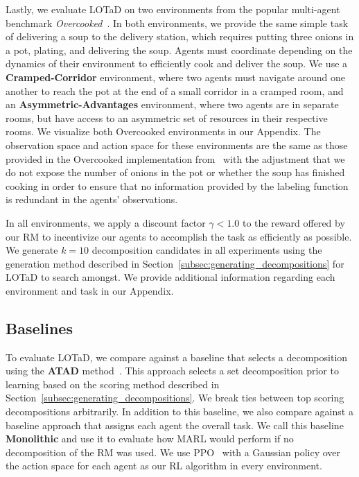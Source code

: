 Lastly, we evaluate LOTaD on two environments from the popular multi-agent benchmark \textit{Overcooked}~\cite{carroll2019overcooked}. In both environments, we provide the same simple task of delivering a soup to the delivery station, which requires putting three onions in a pot, plating, and delivering the soup. Agents must coordinate depending on the dynamics of their environment to efficiently cook and deliver the soup. We use a \textbf{Cramped-Corridor} environment, where two agents must navigate around one another to reach the pot at the end of a small corridor in a cramped room, and an \textbf{Asymmetric-Advantages} environment, where two agents are in separate rooms, but have access to an asymmetric set of resources in their respective rooms. We visualize both Overcooked environments in our Appendix. The observation space and action space for these environments are the same as those provided in the Overcooked implementation from~\cite{flair2023jaxmarl} with the adjustment that we do not expose the number of onions in the pot or whether the soup has finished cooking in order to ensure that no information provided by the labeling function is redundant in the agents' observations.


 In all environments, we apply a discount factor $\gamma < 1.0$ to the reward offered by our RM to incentivize our agents to accomplish the task as efficiently as possible. We generate $k=10$ decomposition candidates in all experiments using the generation method described in Section~\ref{subsec:generating_decompositions} for LOTaD to search amongst. We provide additional information regarding each environment and task in our Appendix. 

\subsection{Baselines}

To evaluate LOTaD, we compare against a baseline that selects a decomposition using the \textbf{ATAD} method~\cite{smith2023automatic}. This approach selects a set decomposition prior to learning based on the scoring method described in Section~\ref{subsec:generating_decompositions}. We break ties between top scoring decompositions arbitrarily. In addition to this baseline, we also compare against a baseline approach that assigns each agent the overall task. We call this baseline \textbf{Monolithic} and use it to evaluate how MARL would perform if no decomposition of the RM was used. %
We use PPO~\cite{schulman2017ppo} with a Gaussian policy over the action space for each agent as our RL algorithm in every environment. 

